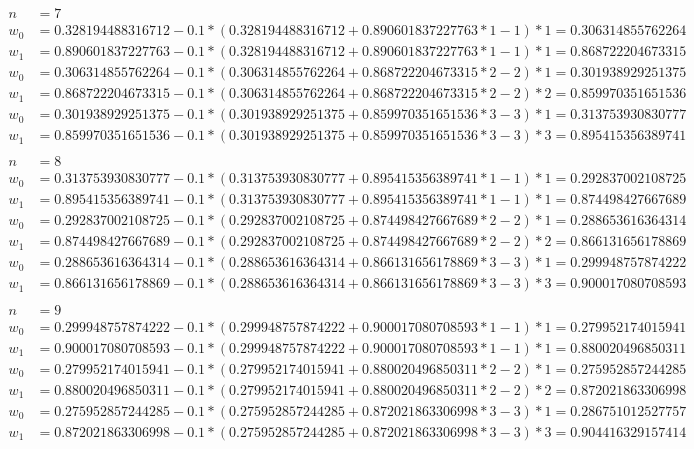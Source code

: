 \documentclass{report}
\begin{document}
\begin{equation} \label{eq1}
\begin{split}
n & = 7 \\
w_0 & = 0.328194488316712 - 0.1 * (0.328194488316712+0.890601837227763*1-1) * 1 = 0.306314855762264\\
w_1 & = 0.890601837227763 - 0.1 * (0.328194488316712+0.890601837227763*1-1) * 1 = 0.868722204673315\\
w_0 & = 0.306314855762264 - 0.1 * (0.306314855762264+0.868722204673315*2-2) * 1 = 0.301938929251375\\
w_1 & = 0.868722204673315 - 0.1 * (0.306314855762264+0.868722204673315*2-2) * 2 = 0.859970351651536\\
w_0 & = 0.301938929251375 - 0.1 * (0.301938929251375+0.859970351651536*3-3) * 1 = 0.313753930830777\\
w_1 & = 0.859970351651536 - 0.1 * (0.301938929251375+0.859970351651536*3-3) * 3 = 0.895415356389741\\
\end{split}
\end{equation}
\begin{equation} \label{eq1}
\begin{split}
n & = 8 \\
w_0 & = 0.313753930830777 - 0.1 * (0.313753930830777+0.895415356389741*1-1) * 1 = 0.292837002108725\\
w_1 & = 0.895415356389741 - 0.1 * (0.313753930830777+0.895415356389741*1-1) * 1 = 0.874498427667689\\
w_0 & = 0.292837002108725 - 0.1 * (0.292837002108725+0.874498427667689*2-2) * 1 = 0.288653616364314\\
w_1 & = 0.874498427667689 - 0.1 * (0.292837002108725+0.874498427667689*2-2) * 2 = 0.866131656178869\\
w_0 & = 0.288653616364314 - 0.1 * (0.288653616364314+0.866131656178869*3-3) * 1 = 0.299948757874222\\
w_1 & = 0.866131656178869 - 0.1 * (0.288653616364314+0.866131656178869*3-3) * 3 = 0.900017080708593\\
\end{split}
\end{equation}
\begin{equation} \label{eq1}
\begin{split}
n & = 9 \\
w_0 & = 0.299948757874222 - 0.1 * (0.299948757874222+0.900017080708593*1-1) * 1 = 0.279952174015941\\
w_1 & = 0.900017080708593 - 0.1 * (0.299948757874222+0.900017080708593*1-1) * 1 = 0.880020496850311\\
w_0 & = 0.279952174015941 - 0.1 * (0.279952174015941+0.880020496850311*2-2) * 1 = 0.275952857244285\\
w_1 & = 0.880020496850311 - 0.1 * (0.279952174015941+0.880020496850311*2-2) * 2 = 0.872021863306998\\
w_0 & = 0.275952857244285 - 0.1 * (0.275952857244285+0.872021863306998*3-3) * 1 = 0.286751012527757\\
w_1 & = 0.872021863306998 - 0.1 * (0.275952857244285+0.872021863306998*3-3) * 3 = 0.904416329157414\\
\end{split}
\end{equation}
\end{document}
